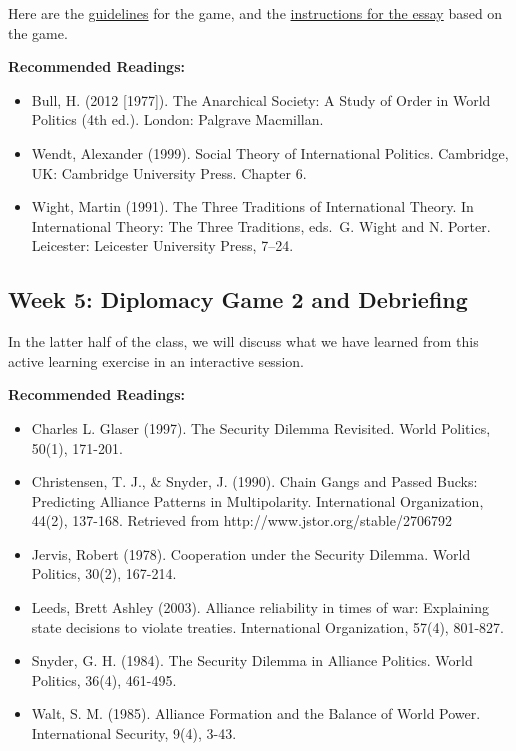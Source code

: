 \documentclass[
  letterpaper,
  DIV=11,
  numbers=noendperiod]{scrartcl}
\providecommand{\tightlist}{%
  \setlength{\itemsep}{0pt}\setlength{\parskip}{0pt}}\usepackage{longtable,booktabs,array}
\begin{document}
Here are the \href{diplomacy-game.qmd}{guidelines} for the game, and the
\href{mid-term-instructions.qmd}{instructions for the essay} based on
the game.

\textbf{Recommended Readings:}

\begin{itemize}
\tightlist
\item
  Bull, H. (2012 {[}1977{]}). The Anarchical Society: A Study of Order
  in World Politics (4th ed.). London: Palgrave Macmillan.
\item
  Wendt, Alexander (1999). Social Theory of International Politics.
  Cambridge, UK: Cambridge University Press. Chapter 6.
\item
  Wight, Martin (1991). The Three Traditions of International Theory. In
  International Theory: The Three Traditions, eds.~G. Wight and N.
  Porter. Leicester: Leicester University Press, 7--24.
\end{itemize}

\hypertarget{week-5-diplomacy-game-2-and-debriefing}{%
\subsection*{Week 5: Diplomacy Game 2 and
Debriefing}\label{week-5-diplomacy-game-2-and-debriefing}}

In the latter half of the class, we will discuss what we have learned
from this active learning exercise in an interactive session.

\textbf{Recommended Readings:}

\begin{itemize}
\tightlist
\item
  Charles L. Glaser (1997). The Security Dilemma Revisited. World
  Politics, 50(1), 171-201.
\item
  Christensen, T. J., \& Snyder, J. (1990). Chain Gangs and Passed
  Bucks: Predicting Alliance Patterns in Multipolarity. International
  Organization, 44(2), 137-168. Retrieved from
  http://www.jstor.org/stable/2706792
\item
  Jervis, Robert (1978). Cooperation under the Security Dilemma. World
  Politics, 30(2), 167-214.
\item
  Leeds, Brett Ashley (2003). Alliance reliability in times of war:
  Explaining state decisions to violate treaties. International
  Organization, 57(4), 801-827.
\item
  Snyder, G. H. (1984). The Security Dilemma in Alliance Politics. World
  Politics, 36(4), 461-495.
\item
  Walt, S. M. (1985). Alliance Formation and the Balance of World Power.
  International Security, 9(4), 3-43.
\end{itemize}
\end{document}
